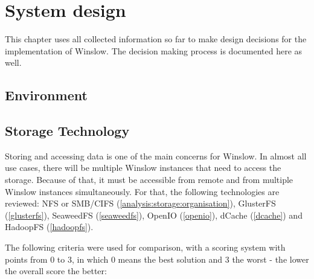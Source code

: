 \chapter{System design}

This chapter uses all collected information so far to make design decisions for the implementation of Winslow.
The decision making process is documented here as well.

\section{Environment}




\section{Storage Technology}

Storing and accessing data is one of the main concerns for Winslow.
In almost all use cases, there will be multiple Winslow instances that need to access the storage.
Because of that, it must be accessible from remote and from multiple Winslow instances simultaneously.
For that, the following technologies are reviewed: NFS or SMB/CIFS (\autoref{analysis:storage:organisation}),  GlusterFS (\autoref{glusterfs}), SeaweedFS (\autoref{seaweedfs}), OpenIO (\autoref{openio}), dCache (\autoref{dcache}) and HadoopFS (\autoref{hadoopfs}).

The following criteria were used for comparison, with a scoring system with points from 0 to 3, in which 0 means the best solution and 3 the worst - the lower the overall score the better:

